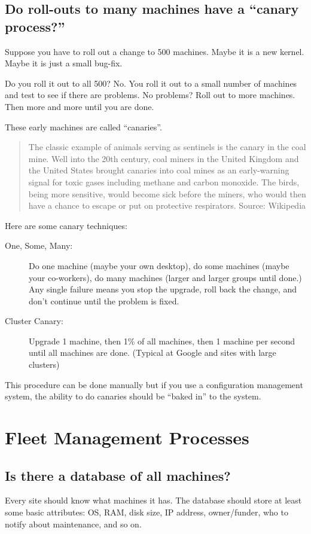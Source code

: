 \documentclass{article}
\begin{document}
\subsection{Do roll-outs to many machines have a ``canary process?''}
Suppose you have to roll out a change to 500 machines. Maybe it is a new kernel. Maybe it is just a small bug-fix.

Do you roll it out to all 500? No. You roll it out to a small number of machines and test to see if there are problems. No problems? Roll out to more machines. Then more and more until you are done.

These early machines are called ``canaries''.

\begin{quote}
	The classic example of animals serving as sentinels is the canary in the coal mine. Well into the 20th century, coal miners in the United Kingdom and the United States brought canaries into coal mines as an early-warning signal for toxic gases including methane and carbon monoxide. The birds, being more sensitive, would become sick before the miners, who would then have a chance to escape or put on protective respirators. Source: Wikipedia
\end{quote}

Here are some canary techniques:

\begin{description}
	\item[One, Some, Many:] Do one machine (maybe your own desktop), do some machines (maybe your co-workers), do many machines (larger and larger groups until done.) Any single failure means you stop the upgrade, roll back the change, and don't continue until the problem is fixed.
	\item [Cluster Canary:] Upgrade 1 machine, then 1\% of all machines, then 1 machine per second until all machines are done. (Typical at Google and sites with large clusters)
\end{description}

This procedure can be done manually but if you use a configuration management system, the ability to do canaries should be ``baked in'' to the system.

\section{Fleet Management Processes}
\subsection{Is there a database of all machines?}
Every site should know what machines it has. The database should store at least some basic attributes: OS, RAM, disk size, IP address, owner/funder, who to notify about maintenance, and so on.
\end{document}
